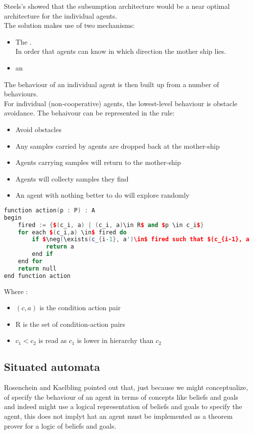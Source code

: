 Steels's showed that the subsumption architecture would be a near optimal architecture for the individual agents.\\
The solution makes use of two mechanisms:
\begin{itemize}
\item The .\\
In order that agents can know in which direction the mother ship lies.
\item an 
\end{itemize}
The behaviour of an individual agent is then built up from a number of behaviours. \\
For individual (non-cooperative) agents, the lowest-level behaviour is obstacle avoidance. The behaivour can be represented in the rule:
\begin{itemize}
\item Avoid obstacles
\item Any samples carried by agents are dropped back at the mother-ship
\item Agents carrying samples will return to the mother-ship
\item Agents will collecty samples they find
\item An agent with nothing better to do will explore randomly
\end{itemize}

\begin{lstlisting}[language=C++, mathescape=true]
function action(p : P) : A
begin
	fired := {$(c_i, a) | (c_i, a)\in R$ and $p \in c_i$}
	for each $(c_i,a) \in$ fired do
		if $\neg(\exists(c_{i-1}, a')\in$ fired such that $(c_{i-1}, a') < (c_i,a)$) then 
			return a
		end if
	end for
	return null
end function action
\end{lstlisting}

Where :
\begin{itemize}
\item $(c,a)$ is the condition action pair
\item R is the set of condition-action pairs
\item $c_1<c_2$ is read as $c_1$ is lower in hierarchy than  $c_2$
\end{itemize}

\subsection{Situated automata}
Rosenchein and Kaelbling pointed out that, just because we might conceptualize, of specify the behaviour of an agent in terms of concepts like beliefs and goals and indeed might use a logical representation of beliefs and goals to specify the agent, this does not implyt hat an agent must be implemented as a theorem prover for a logic of beliefs and goals.

